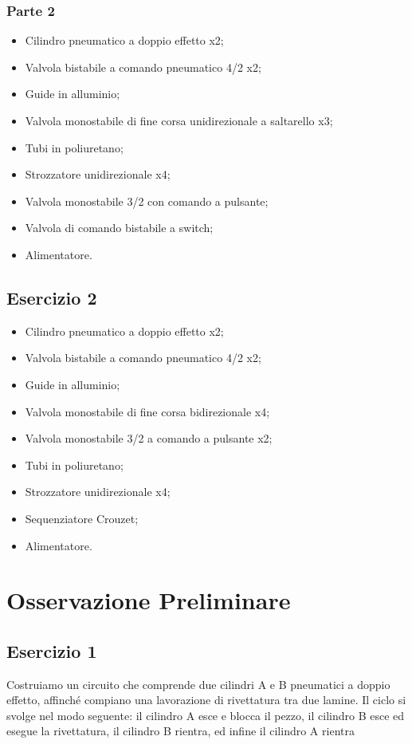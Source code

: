 \documentclass[a4paper]{article}
\begin{document}
\subsubsection{Parte 2}
\begin{itemize}
\item Cilindro pneumatico a doppio effetto x2;
\item Valvola bistabile a comando pneumatico 4/2 x2;
\item Guide in alluminio;
\item Valvola monostabile di fine corsa unidirezionale a saltarello x3;
\item Tubi in poliuretano;
\item Strozzatore unidirezionale x4;
\item Valvola monostabile 3/2 con comando a pulsante;
\item Valvola di comando bistabile a switch;
\item Alimentatore.
\end{itemize}

\subsection{Esercizio 2}

\begin{itemize}
\item Cilindro pneumatico a doppio effetto x2;
\item Valvola bistabile a comando pneumatico 4/2 x2;
\item Guide in alluminio;
\item Valvola monostabile di fine corsa bidirezionale x4;
\item Valvola monostabile 3/2 a comando a pulsante x2;
\item Tubi in poliuretano;
\item Strozzatore unidirezionale x4;
\item Sequenziatore Crouzet;
\item Alimentatore.
\end{itemize}

\section{Osservazione Preliminare}
\subsection{Esercizio 1}
Costruiamo un circuito che comprende due cilindri A e B pneumatici a doppio effetto, affinché compiano una lavorazione di rivettatura tra due lamine. Il ciclo si svolge nel modo seguente: il cilindro A esce e blocca il pezzo, il cilindro B esce ed esegue la rivettatura, il cilindro B rientra, ed infine il cilindro A rientra
\end{document}
